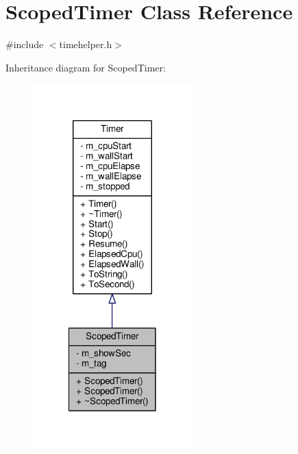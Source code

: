\hypertarget{classScopedTimer}{\section{Scoped\-Timer Class Reference}
\label{classScopedTimer}
}


{\ttfamily \#include $<$timehelper.\-h$>$}



Inheritance diagram for Scoped\-Timer\-:
\nopagebreak
\begin{figure}[H]
\begin{center}
\leavevmode
\includegraphics[width=174pt]{classScopedTimer__inherit__graph}
\end{center}
\end{figure}


